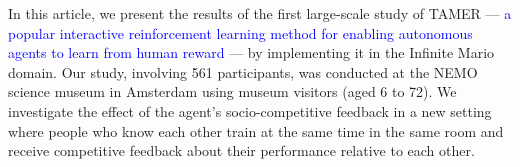 


In this article, we present the results of the first large-scale study of TAMER --- \textcolor{blue}{a popular interactive reinforcement learning method for enabling autonomous agents to learn from human reward \cite{knox2009interactively}} --- by implementing it in the Infinite Mario domain. 
Our study, involving 561 participants, was conducted at the NEMO science museum in Amsterdam using museum visitors (aged 6 to 72). We investigate the effect of the agent's socio-competitive feedback in a new setting 
where people who know each other train at the same time in the same room and receive competitive feedback about their performance relative to each other. %

